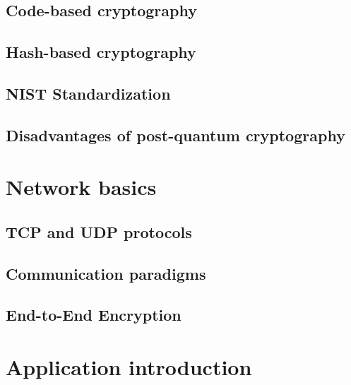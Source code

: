 \section{Code-based cryptography}
\label{sec:code_based_crypto}


\section{Hash-based cryptography}
\label{sec:hash_based_crypto}


\section{NIST Standardization}
\label{sec:nist}


\section{Disadvantages of post-quantum cryptography}
\label{sec:disadvantages}


\chapter{Network basics}
\label{ch:network_baics}


\section{TCP and UDP protocols}
\label{sec:tcp_and_udp}


\section{Communication paradigms}
\label{sec:comm_paradigms}


\section{End-to-End Encryption}
\label{sec:e2e}


\chapter{Application introduction}
\label{ch:app_intro}


